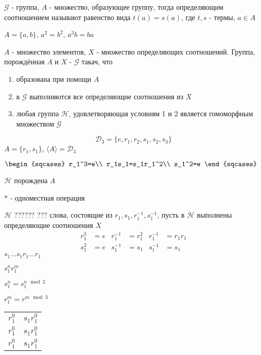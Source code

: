 \documentclass[../main/document.tex]{subfiles}
\begin{document}
\begin{dfn}
$\mathcal{G}$ - группа, $A$ - множество, образующее группу, тогда определяющим соотношением называют равенство вида $t(a)=s(a)$, где $t,s$ - термы, $a\in A$
\end{dfn}

\begin{exm}
$A=\{a,b\}$, $a^2=b^2$, $a^3b=ba$
\end{exm}

\begin{dfn}
$A$ - множество элементов, $X$ - множество определяющих соотношений. Группа, порождённая $A$ и $X$ - $\mathcal{G}$ такач, что
\begin{enumerate}
\item образована при помощи $A$
\item в $\mathcal{G}$ выполняются все определяющие соотношения из $X$
\item любая группа $\mathcal{H}$, удовлетворяющая условиям 1 и 2 является гомоморфным множеством $\mathcal{G}$
\end{enumerate}
\end{dfn}

\begin{exm}
$$\mathcal{D}_3=\{e,r_1,r_2,s_1,s_2,s_3\}$$
$A=\{r_1,s_1\}$, $\langle A\rangle=\mathcal{D}_3$

$
\begin{sqcases}
r_1^3=e\\
r_1s_1=s_1r_1^2\\
s_1^2=e
\end{sqcases}$

$\mathcal{H}$ порождена $A$

$*$ - одноместная операция

$\mathcal{H}$ ?????? ??? слова, состоящие из $r_1,s_1,r_1^{-1},s_1^{-1}$, пусть в $\mathcal{H}$ выполнены определяющие соотношения $X$
\begin{align*}
r_1^3&=e & r_1^{-1}&=r_1^2 & r_1^{-1}&=r_1r_1\\
s_1^2&=e & s_1^{-1}&=s_1 & s_1^{-1}&=s_1
\end{align*}
$s_1...s_1r_1...r_1$

$s_1^nr_1^m$

$s_1^n=s_1^{n\mod 2}$

$r_1^m=r^{m\mod 3}$
\begin{table}[h]
\renewcommand*{\arraystretch}{1.4}
\begin{tabular}{|c c|}

\hline
 $r_1^0$ & $s_1r_1^0$  \\ 
$r_1^0$ & $s_1r_1^0$ \\ 
$r_1^0$ & $s_1r_1^0$  \\ 
\hline
\end{tabular}
\end{table}
\end{exm}
\end{document}
